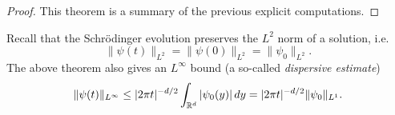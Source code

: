 \begin{proof}
  This theorem is a summary of the previous
  explicit computations.
\end{proof}

\begin{remark}
  Recall that the Schr\"odinger evolution
  preserves the $L^2$ norm of a solution, i.e.
  \[
    \|\psi(t)\|_{L^2} = \|\psi(0)\|_{L^2} = \|\psi_0\|_{L^2}.
  \]
  The above theorem also gives an $L^\infty$ bound
  (a so-called \emph{dispersive estimate})
  \[
    \|\psi(t)\|_{L^\infty}
    \le |2\pi t|^{-d / 2} \int_{\mathbb{R}^d} |\psi_0(y)|\, dy
    = |2\pi t|^{-d / 2} \|\psi_0\|_{L^1}.
  \]
\end{remark}

